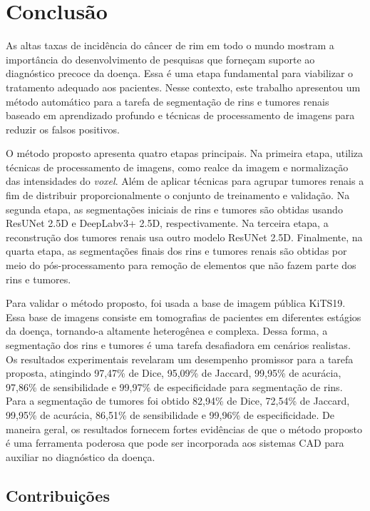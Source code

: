 \chapter{Conclusão}
\label{cap:conclusao}
\phantom{2}

As altas taxas de incidência do câncer de rim em todo o mundo mostram a importância do desenvolvimento de pesquisas que forneçam suporte ao diagnóstico precoce da doença. Essa é uma etapa fundamental para viabilizar o tratamento adequado aos pacientes. Nesse contexto, este trabalho apresentou um método automático para a tarefa de segmentação de rins e tumores renais baseado em aprendizado profundo e técnicas de processamento de imagens para reduzir os falsos positivos.

O método proposto apresenta quatro etapas principais. Na primeira etapa, utiliza técnicas de processamento de imagens, como realce da imagem e normalização das intensidades do \textit{voxel}. Além de aplicar técnicas para agrupar tumores renais a fim de distribuir proporcionalmente o conjunto de treinamento e validação. Na segunda etapa, as segmentações iniciais de rins e tumores são obtidas usando ResUNet 2.5D e DeepLabv3+ 2.5D, respectivamente. Na terceira etapa, a reconstrução dos tumores renais usa outro modelo ResUNet 2.5D. Finalmente, na quarta etapa, as segmentações finais dos rins e tumores renais são obtidas por meio do pós-processamento para remoção de elementos que não fazem parte dos rins e tumores.

Para validar o método proposto, foi usada a base de imagem pública KiTS19. Essa base de imagens consiste em tomografias de pacientes em diferentes estágios da doença, tornando-a altamente heterogênea e complexa. Dessa forma, a segmentação dos rins e tumores é uma tarefa desafiadora em cenários realistas. Os resultados experimentais revelaram um desempenho promissor para a tarefa proposta, atingindo 97,47\% de Dice, 95,09\% de Jaccard, 99,95\% de acurácia, 97,86\% de sensibilidade e 99,97\% de especificidade para segmentação de rins. Para a segmentação de tumores foi obtido 82,94\% de Dice, 72,54\% de Jaccard, 99,95\% de acurácia, 86,51\% de sensibilidade e 99,96\% de especificidade. De maneira geral, os resultados fornecem fortes evidências de que o método proposto é uma ferramenta poderosa que pode ser incorporada aos sistemas CAD para auxiliar no diagnóstico da doença.

\section{Contribuições}
\label{sec:contribuições}


